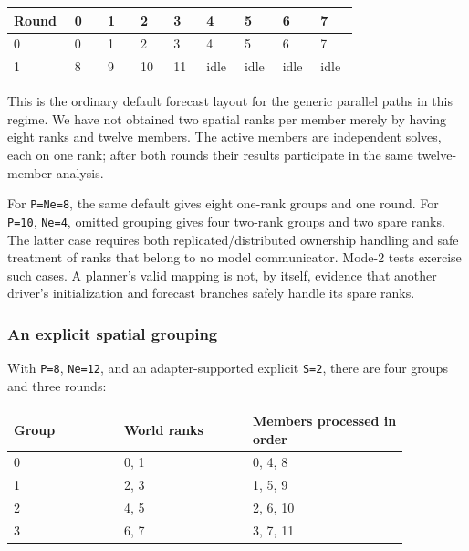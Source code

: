 \documentclass[11pt,a4paper]{article}
\newcommand{\code}[1]{\nolinkurl{#1}}
\begin{document}
\noindent\begin{minipage}{\linewidth}\centering\small\setlength{\tabcolsep}{3pt}\captionsetup{hypcap=false}
\label{tab:memberrounds}
\begin{tabular}{p{0.08333333333333333\linewidth}p{0.08333333333333333\linewidth}p{0.08333333333333333\linewidth}p{0.08333333333333333\linewidth}p{0.08333333333333333\linewidth}p{0.08333333333333333\linewidth}p{0.08333333333333333\linewidth}p{0.08333333333333333\linewidth}p{0.08333333333333333\linewidth}}
\toprule
Round & 0 & 1 & 2 & 3 & 4 & 5 & 6 & 7\\\midrule
0 & 0 & 1 & 2 & 3 & 4 & 5 & 6 & 7\\
1 & 8 & 9 & 10 & 11 & idle & idle & idle & idle\\
\bottomrule\end{tabular}
\end{minipage}


This is the ordinary default forecast layout for the generic parallel paths in this regime. We have not obtained two spatial ranks per member merely by having eight ranks and twelve members. The active members are independent solves, each on one rank; after both rounds their results participate in the same twelve-member analysis.

For \code{P=Ne=8}, the same default gives eight one-rank groups and one round. For \code{P=10}, \code{Ne=4}, omitted grouping gives four two-rank groups and two spare ranks. The latter case requires both replicated/distributed ownership handling and safe treatment of ranks that belong to no model communicator. Mode-2 tests exercise such cases. A planner's valid mapping is not, by itself, evidence that another driver's initialization and forecast branches safely handle its spare ranks.

\subsubsection{An explicit spatial grouping}

With \code{P=8}, \code{Ne=12}, and an adapter-supported explicit \code{S=2}, there are four groups and three rounds:

\noindent\begin{minipage}{\linewidth}\centering\small\setlength{\tabcolsep}{3pt}\captionsetup{hypcap=false}
\label{tab:spatialgroups}
\begin{tabular}{p{0.24\linewidth}p{0.28\linewidth}p{0.34\linewidth}}

\toprule
Group & World ranks & Members processed in order\\\midrule
0 & 0, 1 & 0, 4, 8\\
1 & 2, 3 & 1, 5, 9\\
2 & 4, 5 & 2, 6, 10\\
3 & 6, 7 & 3, 7, 11\\
\bottomrule\end{tabular}
\end{minipage}
\end{document}
